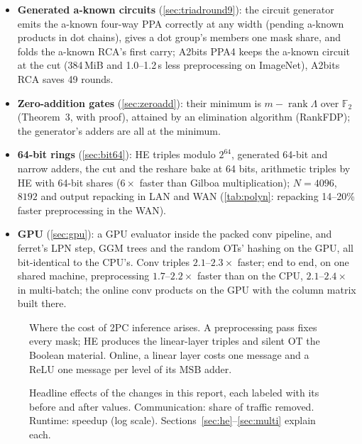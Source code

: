 \documentclass[10pt,a4paper]{article}
\newcommand{\s}{\,s\xspace}
\begin{document}
\begin{itemize}
  they compute and of their security (\cref{sec:truncformal}).
\item \textbf{Generated a-known circuits} (\cref{sec:triadround9}): the circuit generator emits the a-known four-way PPA
  correctly at any width (pending a-known products in dot chains), gives a dot group's members one mask share, and folds
  the a-known RCA's first carry; A2bits PPA4 keeps the a-known circuit at the cut (384\,MiB and 1.0--1.2\s less
  preprocessing on ImageNet), A2bits RCA saves 49 rounds.
\item \textbf{Zero-addition gates} (\cref{sec:zeroadd}): their minimum is $m - \operatorname{rank}\Lambda$ over
  $\mathbb{F}_2$ (Theorem~3, with proof), attained by an elimination algorithm (RankFDP); the generator's adders are all
  at the minimum.
\item \textbf{64-bit rings} (\cref{sec:bit64}): HE triples modulo $2^{64}$, generated 64-bit and narrow adders, the cut
  and the reshare bake at 64 bits, arithmetic triples by HE with 64-bit shares ($6\times$ faster than Gilboa
  multiplication); $N = 4096$, $8192$ and output repacking in LAN and WAN (\cref{tab:polyn}: repacking 14--20\% faster
  preprocessing in the WAN).
\item \textbf{GPU} (\cref{sec:gpu}): a GPU evaluator inside the packed conv pipeline, and ferret's LPN step, GGM trees
  and the random OTs' hashing on the GPU, all bit-identical to the CPU's. Conv triples $2.1\text{--}2.3\times$ faster;
  end to end, on one shared machine, preprocessing $1.7\text{--}2.2\times$ faster than on the CPU, $2.1\text{--}2.4\times$ in
  multi-batch; the online conv products on the GPU with the column matrix built there.
\end{itemize}

\begin{figure}[t]
  \centering
  \caption{Where the cost of 2PC inference arises. A preprocessing pass fixes every mask; HE produces the
  linear-layer triples and silent OT the Boolean material. Online, a linear layer costs one message and a
  ReLU one message per level of its MSB adder.}
  \label{fig:overview}
\end{figure}

\begin{figure}[t]
  \centering
  \caption{Headline effects of the changes in this report, each labeled with its before and after values. Communication:
  share of traffic removed. Runtime: speedup (log scale). Sections~\ref{sec:he}--\ref{sec:multi} explain each.}
  \label{fig:summary}
\end{figure}
\end{document}
